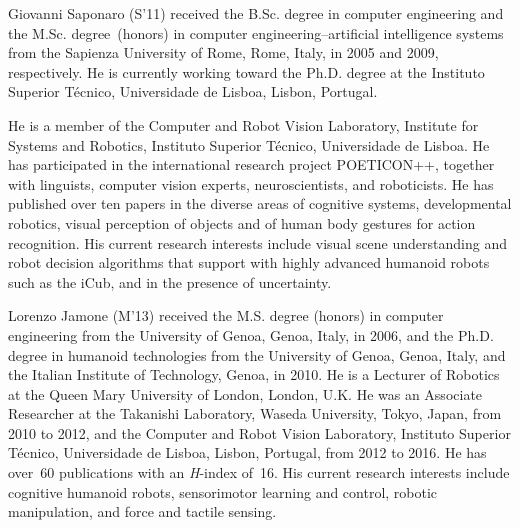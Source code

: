
\begin{IEEEbiography}{Giovanni Saponaro}
  (S'11)
  received the B.Sc. degree in computer engineering and the M.Sc. degree~(honors) in computer engineering--artificial intelligence systems from the Sapienza University of Rome, Rome, Italy, in 2005 and 2009, respectively.
  He is currently working toward the Ph.D. degree at the Instituto Superior Técnico, Universidade de Lisboa, Lisbon, Portugal.

  He is a member of the Computer and Robot Vision Laboratory, Institute for Systems and Robotics, Instituto Superior Técnico, Universidade de Lisboa.
  He has participated in the international research project POETICON++, together with linguists, computer vision experts, neuroscientists, and roboticists.
  He has published over ten papers in the diverse areas of cognitive systems, developmental robotics, visual perception of objects and of human body gestures for action recognition.
  His current research interests include visual scene understanding and robot decision algorithms that support \hri{} with highly advanced humanoid robots such as the iCub, and in the presence of uncertainty.
\end{IEEEbiography}

\begin{IEEEbiography}{Lorenzo Jamone}
  (M'13)
  received the M.S. degree (honors) in computer engineering from the University of Genoa, Genoa, Italy, in 2006, and the Ph.D. degree in humanoid technologies from the University of Genoa, Genoa, Italy, and the Italian Institute of Technology, Genoa, in 2010.
  He is a Lecturer of Robotics at the Queen Mary University of London, London, U.K.
  He was an Associate Researcher at the Takanishi Laboratory, Waseda University, Tokyo, Japan, from 2010 to 2012, and the Computer and Robot Vision Laboratory, Instituto Superior Técnico, Universidade de Lisboa, Lisbon, Portugal, from 2012 to 2016.
  He has over~60 publications with an \emph{H}-index of~16.
  His current research interests include cognitive humanoid robots, sensorimotor learning and control, robotic manipulation, and force and tactile sensing.
\end{IEEEbiography}

